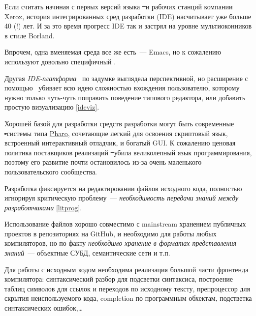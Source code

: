 \label{ide}\secdown


\clearpage
Если считать начиная с первых версий языка \st\ и рабочих станций компании
Xerox, история интегрированных сред разработки (IDE) насчитывает уже больше 40
(!) лет. И за это время прогресс IDE так и застрял на уровне мультиоконников
в стиле Borland.

Впрочем, одна вменяемая среда все же есть\ --- Emacs, но к
сожалению  используют довольно
специфичный \lisp.

Другая \emph{IDE-платформа} \eclipse\ по задумке выглядела перспективной, но
расширение с помощью \java\ убивает всю идею сложностью вхождения пользователю,
которому нужно только чуть-чуть поправить поведение типового редактора, или
добавить простую визуализацию \ref{ideviz}.

Хорошей базой для разработки средств разработки могут быть современные \st-системы типа
\href{https://pharo.org}{Pharo}, сочетающие легкий для освоения скриптовый язык,
встроенный интерактивный отладчик, и богатый GUI. К сожалению ценовая политика
поставщиков реализаций \st\ убила великолепный язык программирования, поэтому
его развитие почти остановилось из-за очень маленького пользовательского
сообщества.

\secdown


Разработка фиксируется на редактировании файлов исходного кода, полностью
игнорируя критическую проблему\ --- \emph{необходимость передачи знаний между
разработчиками} \ref{litprog}.

Использование файлов хорошо совместимо с mainstream хранением публичных проектов
в репозиториях на GitHub, и необходимо для работы любых компиляторов, но по
факту \emph{необходимо хранение в форматах представления знаний}\ --- объектные
СУБД, семантические сети и т.п.


Для работы с исходным кодом необходима реализация большой части фронтенда
компилятора: синтаксический разбор для подсветки синтаксиса, построение таблиц
символов для ссылок и переходов по исходному тексту, препроцессор для скрытия
неиспользуемого кода, completion по программным обхектам, подстветка
синтаксических ошибок,\ldots


\label{ideviz}


\secup



\secup

